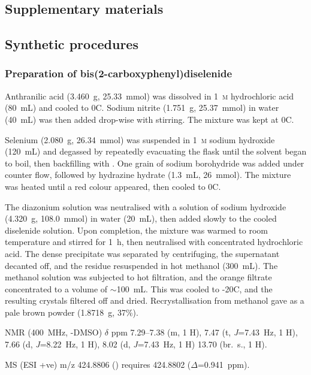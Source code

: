 \begin{refsection}
\section{Supplementary materials}

\subsection{Synthetic procedures}

\subsubsection[Preparation of \refcmpd{diselenide}]{Preparation of bis(2-carboxyphenyl)diselenide }\label{sec:diselenide_prep}
Anthranilic acid (3.460~g, 25.33~mmol) was dissolved in 1~\textsc{m} hydrochloric acid (80~mL) and cooled to 0\degree{}C.
Sodium nitrite (1.751~g, 25.37~mmol) in water (40~mL) was then added drop-wise with stirring.
The mixture was kept at 0\degree{}C.

Selenium (2.080~g, 26.34~mmol) was suspended in 1~\textsc{m} sodium hydroxide (120~mL) and degassed by repeatedly evacuating the flask until the solvent began to boil, then backfilling with .
One grain of sodium borohydride was added under  counter flow, followed by hydrazine hydrate (1.3~mL, 26~mmol).
The mixture was heated until a red colour appeared, then cooled to 0\degree{}C.

The diazonium solution was neutralised with a solution of sodium hydroxide (4.320~g, 108.0~mmol) in water (20~mL), then added slowly to the cooled diselenide solution.
Upon completion, the mixture was warmed to room temperature and stirred for 1~h, then neutralised with concentrated hydrochloric acid.
The dense precipitate was separated by centrifuging, the supernatant decanted off, and the residue resuspended in hot methanol (300~mL).
The methanol solution was subjected to hot filtration, and the orange filtrate concentrated to a volume of $\sim$100~mL.
This was cooled to -20\degree{}C, and the resulting crystals filtered off and dried.
Recrystallisation from methanol gave  as a pale brown powder (1.8718~g, 37\%).

 NMR (400~MHz, -DMSO) $ \delta $ ppm
7.29--7.38 (m, 1 H),
7.47 (t, \textit{J}=7.43~Hz, 1 H),
7.66 (d, \textit{J}=8.22~Hz, 1 H),
8.02 (d, \textit{J}=7.43~Hz, 1 H)
13.70 (br.\ s., 1 H).

MS (ESI +ve) m/z 424.8806 ()  requires 424.8802 ($ \Delta $=0.941~ppm).


\end{refsection}
